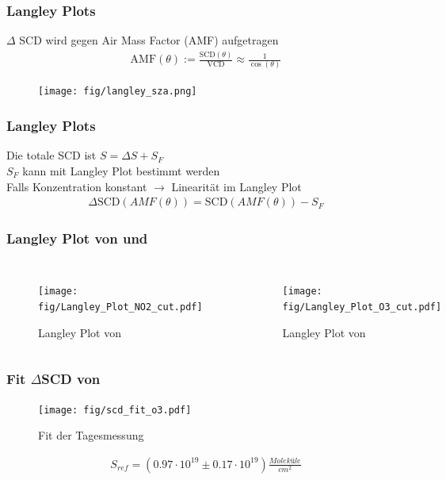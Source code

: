 \documentclass{beamer}
\begin{document}
\begin{frame}
    \frametitle{Langley Plots}
    $\Delta$ SCD wird gegen Air Mass Factor (AMF) aufgetragen\\
    \begin{align}
        \text{AMF}(\theta) := \frac{\text{SCD}(\theta)}{\text{VCD}} \approx \frac{1}{\cos (\theta)}
    \end{align}
    \begin{figure}
        \texttt{[image: fig/langley\_sza.png]}
    \end{figure}
\end{frame}

\begin{frame}
    \frametitle{Langley Plots}
    Die totale SCD ist $S = \Delta S + S_F$\\
    $S_F$ kann mit Langley Plot bestimmt werden\\
    Falls Konzentration konstant $\to$ Linearität im Langley Plot
    \begin{align}
    	\Delta \text{SCD}(AMF(\theta)) = \text{SCD}(AMF(\theta)) - S_F
    \end{align}
\end{frame}

\begin{frame}
    \frametitle{Langley Plot von  und }
    \begin{columns}
        \begin{figure}
    		\texttt{[image: fig/Langley\_Plot\_NO2\_cut.pdf]}
            \caption{Langley Plot von }   
	 	\end{figure}
 	    \begin{figure}
 	    	\texttt{[image: fig/Langley\_Plot\_O3\_cut.pdf]}
 	        \caption{Langley Plot von }
     	\end{figure} 
    \end{columns} 	
\end{frame}

\begin{frame}
    \frametitle{Fit $\Delta$SCD von }
    \begin{figure}
    	\texttt{[image: fig/scd\_fit\_o3.pdf]}
    	\caption{Fit der Tagesmessung }
    \end{figure}
	\begin{align}
		S_{ref}= (0.97 \cdot 10^{19}\pm 0.17 \cdot 10^{19}) \si{\frac{Moleküle}{cm^2}}
	\end{align}
\end{frame}
\end{document}
